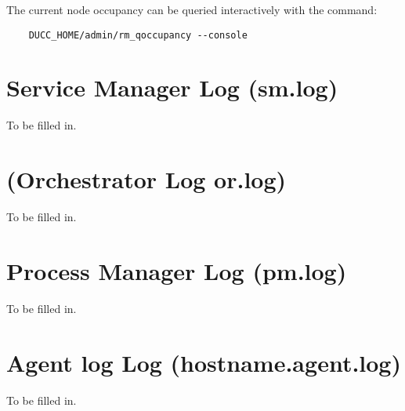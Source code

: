     The current node occupancy can be queried interactively with the command:
\begin{verbatim}
    DUCC_HOME/admin/rm_qoccupancy --console
\end{verbatim}
    
\section{Service  Manager Log (sm.log)}
    To be filled in.

\section{ (Orchestrator Log or.log)}
    To be filled in.

\section{Process Manager Log (pm.log)}
    To be filled in.

\section{Agent log Log (hostname.agent.log)}
    To be filled in.
